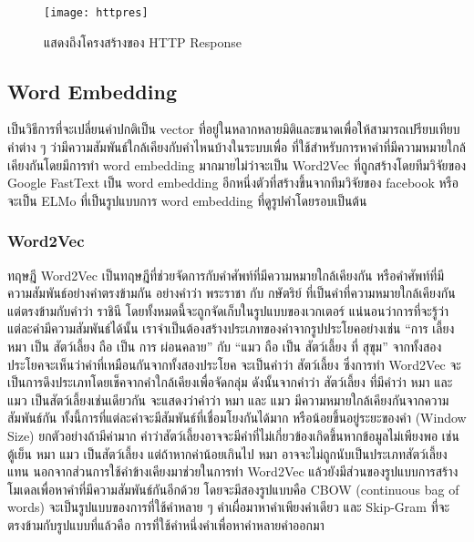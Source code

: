 \begin{figure}[H]
    \centering
    \texttt{[image: httpres]}
    \caption{แสดงถึงโครงสร้างของ HTTP Response \cite{Saixiii}}\label{fig:httpres}
\end{figure}

\subsection{Word Embedding}

เป็นวิธีการที่จะเปลี่ยนคำปกติเป็น vector ที่อยู่ในหลากหลายมิติและขนาดเพื่อให้สามารถเปรียบเทียบคำต่าง ๆ ว่ามีความสัมพันธ์ใกล้เคียงกับคำไหนบ้างในระบบเพื่อ
ที่ใช้สำหรับการหาคำที่มีความหมายใกล้เคียงกันโดยมีการทำ word embedding มากมายไม่ว่าจะเป็น Word2Vec \cite{xin} \cite{Goldberg} ที่ถูกสร้างโดยทีมวิจัยของ 
Google FastText \cite{fasttext} เป็น word embedding อีกหนึ่งตัวที่สร้างขึ้นจากทีมวิจัยของ facebook หรือจะเป็น ELMo \cite{matthew} ที่เป็นรูปแบบการ word embedding ที่ดูรูปคำโดยรอบเป็นต้น 

\subsubsection{Word2Vec}
ทฤษฎี Word2Vec\cite{shortStoryForWord2Vec} เป็นทฤษฎีที่ช่วยจัดการกับคำศัพท์ที่มีความหมายใกล้เคียงกัน หรือคำศัพท์ที่มีความสัมพันธ์อย่างคำตรงข้ามกัน 
อย่างคำว่า พระราชา กับ กษัตริย์ ที่เป็นคำที่ความหมายใกล้เคียงกัน แต่ตรงข้ามกับคำว่า ราชินี โดยทั้งหมดนี้จะถูกจัดเก็บในรูปแบบของเวกเตอร์
แน่นอนว่าการที่จะรู้ว่าแต่ละคำมีความสัมพันธ์ได้นั้น เราจำเป็นต้องสร้างประเภทของคำจากรูปประโยคอย่างเช่น “การ เลี้ยง หมา เป็น สัตว์เลี้ยง ถือ เป็น การ ผ่อนคลาย” 
กับ “แมว ถือ เป็น สัตว์เลี้ยง ที่ สุขุม” จากทั้งสองประโยคจะเห็นว่าคำที่เหมือนกันจากทั้งสองประโยค จะเป็นคำว่า สัตว์เลี้ยง ซึ่งการทำ Word2Vec 
จะเป็นการดึงประเภทโดยเช็คจากคำใกล้เคียงเพื่อจัดกลุ่ม ดังนั้นจากคำว่า สัตว์เลี้ยง ที่มีคำว่า หมา และ แมว เป็นสัตว์เลี้ยงเช่นเดียวกัน จะแสดงว่าคำว่า 
หมา และ แมว มีความหมายใกล้เคียงกันจากความสัมพันธ์กัน ทั้งนี้การที่แต่ละคำจะมีสัมพันธ์ที่เชื่อมโยงกันได้มาก หรือน้อยขึ้นอยู่ระยะของคำ (Window Size) 
ยกตัวอย่างถ้ามีค่ามาก คำว่าสัตว์เลี้ยงอาจจะมีคำที่ไม่เกี่ยวข้องเกิดขึ้นหากข้อมูลไม่เพียงพอ เช่น ตู้เย็น หมา แมว เป็นสัตว์เลี้ยง แต่ถ้าหากค่าน้อยเกินไป หมา 
อาจจะไม่ถูกนับเป็นประเภทสัตว์เลี้ยงแทน
นอกจากส่วนการใช้คำข้างเคียงมาช่วยในการทำ Word2Vec แล้วยังมีส่วนของรูปแบบการสร้างโมเดลเพื่อหาคำที่มีความสัมพันธ์กันอีกด้วย 
โดยจะมีสองรูปแบบคือ CBOW (continuous bag of words) จะเป็นรูปแบบของการที่ใช้คำหลาย ๆ คำเผื่อมาหาคำเพียงคำเดียว 
และ Skip-Gram ที่จะตรงข้ามกับรูปแบบที่แล้วคือ การที่ใช้คำหนึ่งคำเพื่อหาคำหลายคำออกมา

